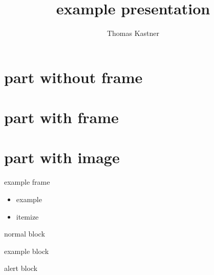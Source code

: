 \documentclass{beamer}
\title{example presentation}
\author{Thomas Kastner}
\begin{document}
    \frame[plain]{\titlepage}

    \part{part without frame}
    \frame[plain]{\partpage}

    \part{part with frame}
    \frame{\partpage}

    \part{part with image}
    \frame[plain]{\partpage}

    \begin{frame}{example frame}
        \begin{itemize}
          \item example
          \item itemize
        \end{itemize}

        \begin{block}{normal}
          block
        \end{block}

        \begin{exampleblock}{example}
          block
        \end{exampleblock}

        \begin{alertblock}{alert}
          block
        \end{alertblock}
    \end{frame}
\end{document}
